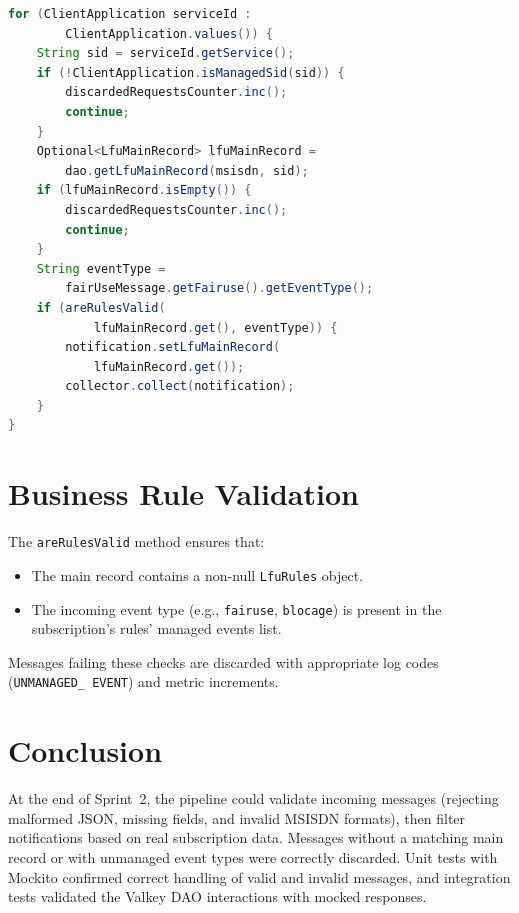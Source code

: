 \begin{lstlisting}[language=Java, caption={Main record retrieval from Valkey}, breaklines=true]
for (ClientApplication serviceId :
        ClientApplication.values()) {
    String sid = serviceId.getService();
    if (!ClientApplication.isManagedSid(sid)) {
        discardedRequestsCounter.inc();
        continue;
    }
    Optional<LfuMainRecord> lfuMainRecord =
        dao.getLfuMainRecord(msisdn, sid);
    if (lfuMainRecord.isEmpty()) {
        discardedRequestsCounter.inc();
        continue;
    }
    String eventType =
        fairUseMessage.getFairuse().getEventType();
    if (areRulesValid(
            lfuMainRecord.get(), eventType)) {
        notification.setLfuMainRecord(
            lfuMainRecord.get());
        collector.collect(notification);
    }
}
\end{lstlisting}

\section{Business Rule Validation}

The \texttt{areRulesValid} method ensures that:
\begin{itemize}
    \item The main record contains a non-null \texttt{LfuRules} object.
    \item The incoming event type (e.g., \texttt{fairuse}, \texttt{blocage}) is present in the subscription's rules' managed events list.
\end{itemize}

Messages failing these checks are discarded with appropriate log codes (\texttt{UNMANAGED\_ EVENT}) and metric increments.

\section*{Conclusion}

At the end of Sprint~2, the pipeline could validate incoming messages (rejecting malformed JSON, missing fields, and invalid MSISDN formats), then filter notifications based on real subscription data. Messages without a matching main record or with unmanaged event types were correctly discarded. Unit tests with Mockito confirmed correct handling of valid and invalid messages, and integration tests validated the Valkey DAO interactions with mocked responses.

